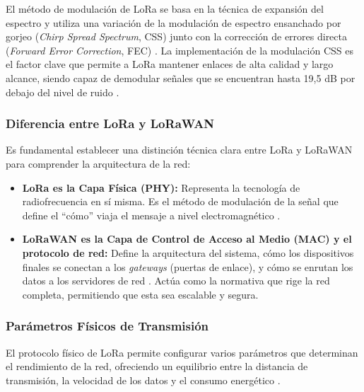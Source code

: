 El método de modulación de LoRa se basa en la técnica de expansión del espectro y utiliza una variación de la modulación de espectro ensanchado por gorjeo (\textit{Chirp Spread Spectrum}, CSS) junto con la corrección de errores directa (\textit{Forward Error Correction}, FEC) \cite{bor2016_lora, semtech_sx1261}. La implementación de la modulación CSS es el factor clave que permite a LoRa mantener enlaces de alta calidad y largo alcance, siendo capaz de demodular señales que se encuentran hasta 19,5 dB por debajo del nivel de ruido \cite{bor2016_lora, jebril2018_overcoming}.

\subsubsection{Diferencia entre LoRa y LoRaWAN}
Es fundamental establecer una distinción técnica clara entre LoRa y LoRaWAN para comprender la arquitectura de la red:
\begin{itemize}
    \item \textbf{LoRa es la Capa Física (PHY):} Representa la tecnología de radiofrecuencia en sí misma. Es el método de modulación de la señal que define el ``cómo'' viaja el mensaje a nivel electromagnético \cite{devalal2018_overview}.
    \item \textbf{LoRaWAN es la Capa de Control de Acceso al Medio (MAC) y el protocolo de red:} Define la arquitectura del sistema, cómo los dispositivos finales se conectan a los \textit{gateways} (puertas de enlace), y cómo se enrutan los datos a los servidores de red \cite{bor2016_lora}. Actúa como la normativa que rige la red completa, permitiendo que esta sea escalable y segura.
\end{itemize}

\subsubsection{Parámetros Físicos de Transmisión}
El protocolo físico de LoRa permite configurar varios parámetros que determinan el rendimiento de la red, ofreciendo un equilibrio entre la distancia de transmisión, la velocidad de los datos y el consumo energético \cite{semtech_sx1261, jebril2018_overcoming}.

